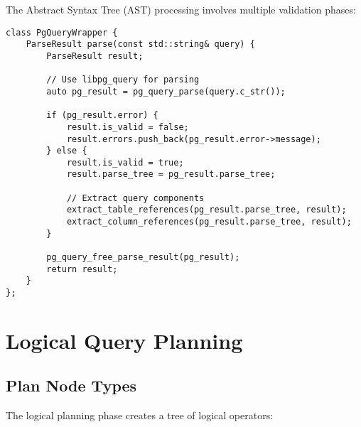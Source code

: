 \documentclass[12pt,a4paper]{article}
\begin{document}
    The Abstract Syntax Tree (AST) processing involves multiple validation phases:

    \begin{lstlisting}[style=cpp, caption=AST Processing Example]
class PgQueryWrapper {
    ParseResult parse(const std::string& query) {
        ParseResult result;

        // Use libpg_query for parsing
        auto pg_result = pg_query_parse(query.c_str());

        if (pg_result.error) {
            result.is_valid = false;
            result.errors.push_back(pg_result.error->message);
        } else {
            result.is_valid = true;
            result.parse_tree = pg_result.parse_tree;

            // Extract query components
            extract_table_references(pg_result.parse_tree, result);
            extract_column_references(pg_result.parse_tree, result);
        }

        pg_query_free_parse_result(pg_result);
        return result;
    }
};
    \end{lstlisting}

    \section{Logical Query Planning}

    \subsection{Plan Node Types}

    The logical planning phase creates a tree of logical operators:
\end{document}

